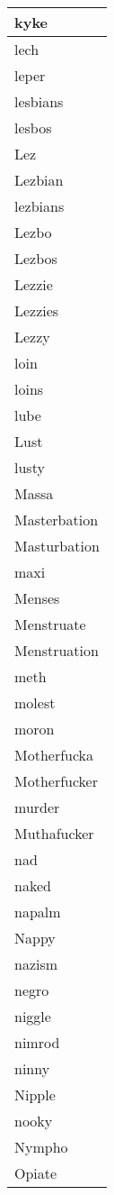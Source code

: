 \begin{longtable}{|l|}
kyke \\ \hline 
lech \\ \hline 
leper \\ \hline 
lesbians \\ \hline 
lesbos \\ \hline 
Lez \\ \hline 
Lezbian \\ \hline 
lezbians \\ \hline 
Lezbo \\ \hline 
Lezbos \\ \hline 
Lezzie \\ \hline 
Lezzies \\ \hline 
Lezzy \\ \hline 
loin \\ \hline 
loins \\ \hline 
lube \\ \hline 
Lust \\ \hline 
lusty \\ \hline 
Massa \\ \hline 
Masterbation \\ \hline 
Masturbation \\ \hline 
maxi \\ \hline 
Menses \\ \hline 
Menstruate \\ \hline 
Menstruation \\ \hline 
meth \\ \hline 
molest \\ \hline 
moron \\ \hline 
Motherfucka \\ \hline 
Motherfucker \\ \hline 
murder \\ \hline 
Muthafucker \\ \hline 
nad \\ \hline 
naked \\ \hline 
napalm \\ \hline 
Nappy \\ \hline 
nazism \\ \hline 
negro \\ \hline 
niggle \\ \hline 
nimrod \\ \hline 
ninny \\ \hline 
Nipple \\ \hline 
nooky \\ \hline 
Nympho \\ \hline 
Opiate \\ \hline 

\end{longtable}
